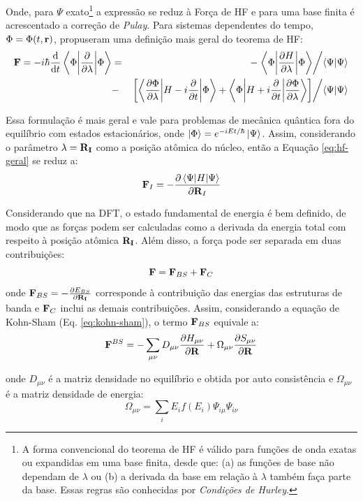Onde, para $ \Psi $ exato\footnote{A forma convencional do teorema de HF é válido para funções de onda exatas ou expandidas em uma base finita, desde que: (a) as funções de base não dependam de $ \lambda $ ou (b) a derivada da base em relação à $ \lambda $ também faça parte da base. Essas regras são conhecidas por \textit{Condições de Hurley}.} a expressão se reduz à Força de HF e para uma base finita é acrescentado a correção de \textit{Pulay}. Para sistemas dependentes do tempo, $ \Phi=\Phi(t,\vb{r}) $, \citeauthor{force-teo3} propuseram uma definição mais geral do teorema de HF:
\begin{eqnarray}\label{eq:hf-geral}
\vb{F}=-i\hbar\dv{t}\ev**{\pdv{}{\lambda}}{\Phi}&=&-\flatfrac{\ev**{\pdv{H}{\lambda}}{\Phi}}{\braket{\Psi}{\Psi}}\nonumber\\&-&\flatfrac{\bqty{\mel**{\pdv{\Phi}{\lambda}}{H-i\pdv{t}}{\Phi}+\mel**{\Phi}{H+i\pdv{t}}{\pdv{\Phi}{\lambda}}}}{\braket{\Psi}{\Psi}}
\end{eqnarray}

Essa formulação é mais geral e vale para problemas de mecânica quântica fora do equilíbrio com estados estacionários, onde $ \ket{\Phi}=e^{-iEt/\hbar}\ket{\Psi} $. Assim, considerando o parâmetro $ \lambda=\vb{R_I} $  como a posição atômica do núcleo, então a Equação \eqref{eq:hf-geral} se reduz a:
\begin{equation}\label{eq:geral-red}
	\vb{F}_I=-\pdv{\ev{H}{\Psi}}{\vb{R}_I}
\end{equation}

Considerando que na DFT, o estado fundamental de energia é bem definido, de modo que as forças podem ser calculadas como a derivada da energia total com respeito à posição atômica $ \vb{R_I} $. Além disso, a força pode ser separada em duas contribuições:
\begin{equation}\label{eq:force-dft}
	\vb{F}=\vb{F}_{BS}+\vb{F}_{C}
\end{equation}
onde $ \vb{F}_{BS}=-\pdv{E_{BS}}{\vb{R_I}} $ corresponde à contribuição das energias das estruturas de banda e $ \vb{F}_{C} $ inclui as demais contribuições. Assim, considerando a equação de Kohn-Sham (Eq. \eqref{eq:kohn-sham}), o termo $ \vb{F}_{BS} $ equivale a:
\begin{equation}
	\vb{F}^{BS}=-\sum_{\mu\nu}D_{\mu\nu}\pdv{H_{\mu\nu}}{\vb{R}}+\Omega_{\mu\nu}\pdv{S_{\mu\nu}}{\vb{R}}
\end{equation}

onde $D_{\mu\nu}$ é a matriz densidade no equilíbrio e obtida por auto consistência e $\Omega_{\mu\nu}$ é a matriz densidade de energia:
$$\Omega_{\mu\nu}=\sum_i E_i f(E_i)\Psi_{i\mu}\Psi_{i\nu}$$

